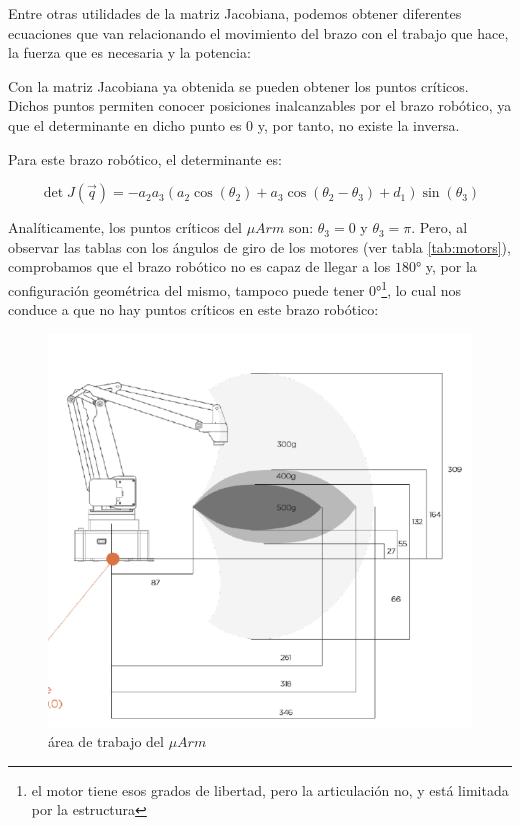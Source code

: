 \documentclass[a4paper,12pt]{article}
\begin{document}
Entre otras utilidades de la matriz Jacobiana, podemos obtener diferentes ecuaciones
que van relacionando el movimiento del brazo con el trabajo que hace, la fuerza que
es necesaria y la potencia:

Con la matriz Jacobiana ya obtenida se pueden obtener los puntos críticos. Dichos puntos
permiten conocer posiciones inalcanzables por el brazo robótico, ya que el determinante
en dicho punto es 0 y, por tanto, no existe la inversa.

Para este brazo robótico, el determinante es:

\begin{equation} \label{eq:det_j}
    \det J(\vec{q}) = - a_{2} a_{3} \left(a_{2} \cos{\left(\theta_{2} \right)} + a_{3} \cos{\left(\theta_{2} - \theta_{3} \right)} + d_{1}\right) \sin{\left(\theta_{3} \right)}
\end{equation}

Analíticamente, los puntos críticos del $\mu Arm$ son: $\theta_3 = 0$ y $\theta_3 = \pi$.
Pero, al observar las tablas con los ángulos de giro de los motores (ver tabla \ref{tab:motors}),
comprobamos que el brazo robótico no es capaz de llegar a los $\ang{180}$ y, por la configuración
geométrica del mismo, tampoco puede tener $\ang{0}$\footnote
{el motor tiene esos grados de libertad, pero la articulación no, y está limitada por la estructura},
lo cual nos conduce a que no hay puntos críticos en este brazo robótico:

\begin{figure}[H]
    \centering
    \includegraphics[width=.8\linewidth]{images/arm_weights_distances.png}
    \caption{área de trabajo del $\mu Arm$ \cite{noauthor_uarm_2019-1}}
    \label{fig:working_area}
\end{figure}
\end{document}
